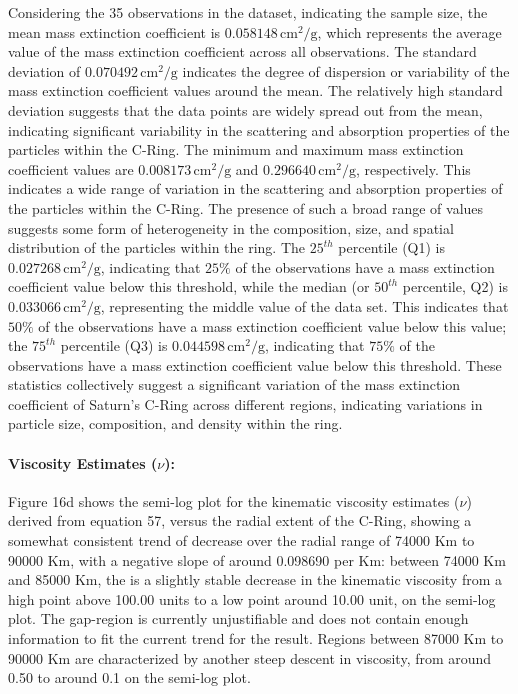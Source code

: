 \documentclass{article}
\begin{document}
Considering the 35 observations in the dataset, indicating the sample size, the mean mass extinction coefficient is \(0.058148 \, \text{cm}^2/\text{g}\), which represents the average value of the mass extinction coefficient across all observations. The standard deviation of \(0.070492 \, \text{cm}^2/\text{g}\) indicates the degree of dispersion or variability of the mass extinction coefficient values around the mean. The relatively high standard deviation suggests that the data points are widely spread out from the mean, indicating significant variability in the scattering and absorption properties of the particles within the C-Ring. The minimum and maximum mass extinction coefficient values are \(0.008173 \, \text{cm}^2/\text{g}\) and \(0.296640 \, \text{cm}^2/\text{g}\), respectively. This indicates a wide range of variation in the scattering and absorption properties of the particles within the C-Ring. The presence of such a broad range of values suggests some form of heterogeneity in the composition, size, and spatial distribution of the particles within the ring. The \(25^{th}\) percentile (Q1) is \(0.027268 \, \text{cm}^2/\text{g}\), indicating that \(25\%\) of the observations have a mass extinction coefficient value below this threshold, while the median (or \(50^{th}\) percentile, Q2) is \(0.033066 \, \text{cm}^2/\text{g}\), representing the middle value of the data set. This indicates that \(50\%\) of the observations have a mass extinction coefficient value below this value; the \(75^{th}\) percentile (Q3) is \(0.044598 \, \text{cm}^2/\text{g}\), indicating that \(75\%\) of the observations have a mass extinction coefficient value below this threshold. These statistics collectively suggest a significant variation of the mass extinction coefficient of Saturn's C-Ring across different regions, indicating variations in particle size, composition, and density within the ring.


\paragraph{Viscosity Estimates ($\nu$):}
Figure 16d shows the semi-log plot for the kinematic viscosity estimates ($\nu$) derived from equation 57, versus the radial extent of the C-Ring, showing a somewhat consistent trend of decrease over the radial range of 74000 Km to 90000 Km, with a negative slope of around 0.098690 per Km: between 74000 Km and 85000 Km, the is a slightly stable decrease in the kinematic viscosity from a high point above 100.00 units to a low point around 10.00 unit, on the semi-log plot. The gap-region is currently unjustifiable and does not contain enough information to fit the current trend for the result. Regions between 87000 Km to 90000 Km are characterized by another steep descent in viscosity, from around 0.50 to around 0.1 on the semi-log plot.
\end{document}
